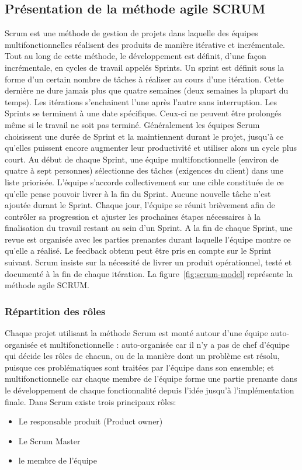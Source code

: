 \subsection{Présentation de la méthode agile SCRUM}

Scrum est une méthode de gestion de projets dans laquelle des équipes
multifonctionnelles réalisent des produits de manière itérative et incrémentale.
Tout au long de cette méthode, le développement est définit, d'une façon
incrémentale, en cycles de travail appelés Sprints. Un sprint est définit sous
la forme d'un certain nombre de tâches à réaliser au cours d'une itération.
Cette dernière ne dure jamais plus que quatre semaines (deux semaines la
plupart du temps). Les itérations s'enchainent l'une après l'autre sans
interruption. Les Sprints se terminent à une date spécifique. Ceux-ci ne
peuvent être prolongés même si le travail ne soit pas terminé. Généralement les équipes
Scrum choisissent une durée de Sprint et la maintiennent durant le projet, jusqu'à ce
qu'elles puissent encore augmenter leur productivité et utiliser alors un cycle plus court.
Au début de chaque Sprint, une équipe multifonctionnelle (environ de quatre à sept
personnes) sélectionne des tâches (exigences du client) dans une liste priorisée.
L'équipe s'accorde collectivement sur une cible constituée de ce qu'elle pense pouvoir
livrer à la fin du Sprint. Aucune nouvelle tâche n'est ajoutée durant le Sprint. Chaque
jour, l'équipe se réunit brièvement afin de contrôler sa progression et ajuster les
prochaines étapes nécessaires à la finalisation du travail restant au sein d'un Sprint. A la
fin de chaque Sprint, une revue est organisée avec les parties prenantes durant laquelle
l'équipe montre ce qu'elle a réalisé. Le feedback obtenu peut être pris en compte sur le
Sprint suivant.
Scrum insiste sur la nécessité de livrer un produit opérationnel, testé et
documenté à la fin de chaque itération.
La figure~\ref{fig:scrum-model} représente la méthode agile SCRUM. 



\subsubsection{Répartition des rôles}

Chaque projet utilisant la méthode Scrum est monté autour d'une équipe auto-
organisée et multifonctionnelle : auto-organisée car il n'y a pas de chef d'équipe qui
décide les rôles de chacun, ou de la manière dont un problème est résolu, puisque ces
problématiques sont traitées par l'équipe dans son ensemble; et multifonctionnelle car
chaque membre de l'équipe forme une partie prenante dans le développement de
chaque fonctionnalité depuis l'idée jusqu'à l'implémentation finale.
Dans Scrum existe trois principaux rôles:
\begin{itemize}
 \item Le responsable produit (Product owner)
 \item Le Scrum Master
 \item le membre de l'équipe
\end{itemize}


